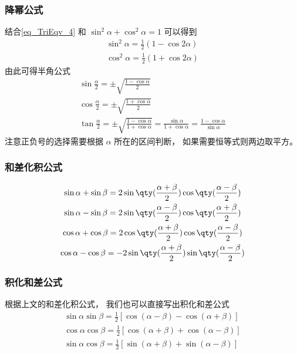 \subsubsection{降幂公式}
结合\autoref{eq_TriEqv_4} 和 $\sin^2 \alpha + \cos^2 \alpha = 1$ 可以得到
\begin{gather}
\sin^2 \alpha = \frac12 (1- \cos 2\alpha) \label{eq_TriEqv_5} \\
\cos^2 \alpha = \frac12 (1+\cos 2\alpha) \label{eq_TriEqv_6}
\end{gather}
由此可得半角公式
\begin{gather}
\sin\frac{ \alpha}{2} = \pm\sqrt{\frac{1-\cos \alpha}{2}}\\
\cos\frac{ \alpha}{2}= \pm\sqrt{\frac{1+\cos \alpha}{2}}\\
\tan\frac{ \alpha}{2} = \pm\sqrt{\frac{1-\cos \alpha}{1+\cos \alpha}} = \frac{\sin \alpha}{1+\cos \alpha} = \frac{1-\cos \alpha}{\sin \alpha}
\end{gather}
注意正负号的选择需要根据 $\alpha$ 所在的区间判断， 如果需要恒等式则两边取平方。

\subsubsection{和差化积公式}
\begin{gather}
\sin \alpha + \sin \beta = 2\sin\qty(\frac{\alpha + \beta}{2})\cos\qty(\frac{\alpha - \beta}{2})\label{eq_TriEqv_7}\\
\sin \alpha - \sin \beta = 2\sin\qty(\frac{\alpha - \beta}{2})\cos\qty(\frac{\alpha + \beta}{2})\label{eq_TriEqv_8}\\
\cos \alpha + \cos \beta = 2\cos\qty(\frac{\alpha+\beta}{2})\cos\qty(\frac{\alpha-\beta}{2})\label{eq_TriEqv_9}\\
\cos \alpha - \cos \beta = -2\sin\qty(\frac{\alpha+\beta}{2})\sin\qty(\frac{\alpha-\beta}{2})\label{eq_TriEqv_10}
\end{gather}

\subsubsection{积化和差公式}
根据上文的和差化积公式， 我们也可以直接写出积化和差公式
\begin{gather}
\label{eq_TriEqv_11}
\sin \alpha\sin \beta = \frac12 [\cos(\alpha - \beta) - \cos(\alpha + \beta)]\\
\label{eq_TriEqv_12}
\cos \alpha\cos \beta = \frac12 [\cos(\alpha + \beta) + \cos(\alpha - \beta)]\\
\label{eq_TriEqv_14}
\sin \alpha\cos \beta = \frac12 [\sin(\alpha + \beta) + \sin(\alpha - \beta)]
\end{gather}

